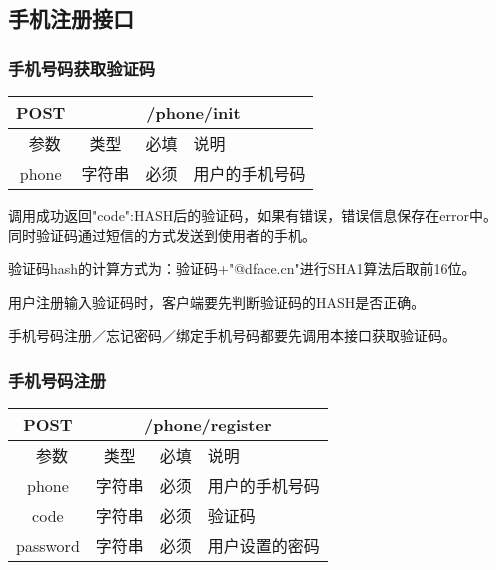 \subsection{手机注册接口}

\subsubsection{手机号码获取验证码}
\label{hash_algorithm}

\begin{table}[H]
   \begin{center}
\begin{tabular}{|c|c|c|p{12cm}|}
\hline
POST & \multicolumn{3}{|c|}{/phone/init} \\
\hline\hline
 \  参数  & 类型 & 必填 &  说明  \\
\hline
 phone  & 字符串 & 必须 &  用户的手机号码\\
\hline
\end{tabular}
   \end{center}
\end{table}

调用成功返回{"code":HASH后的验证码}，如果有错误，错误信息保存在error中。
同时验证码通过短信的方式发送到使用者的手机。

验证码hash的计算方式为：验证码+"@dface.cn"进行SHA1算法后取前16位。

用户注册输入验证码时，客户端要先判断验证码的HASH是否正确。

手机号码注册／忘记密码／绑定手机号码都要先调用本接口获取验证码。

\subsubsection{手机号码注册}
\label{hash_algorithm}

\begin{table}[H]
   \begin{center}
\begin{tabular}{|c|c|c|p{12cm}|}
\hline
POST & \multicolumn{3}{|c|}{/phone/register} \\
\hline\hline
 \  参数  & 类型 & 必填 &  说明  \\
\hline
 phone  & 字符串 & 必须 &  用户的手机号码\\
\hline
 code  & 字符串 & 必须 &  验证码\\
\hline
 password  & 字符串 & 必须 &  用户设置的密码\\
\hline
\end{tabular}
   \end{center}
\end{table}

